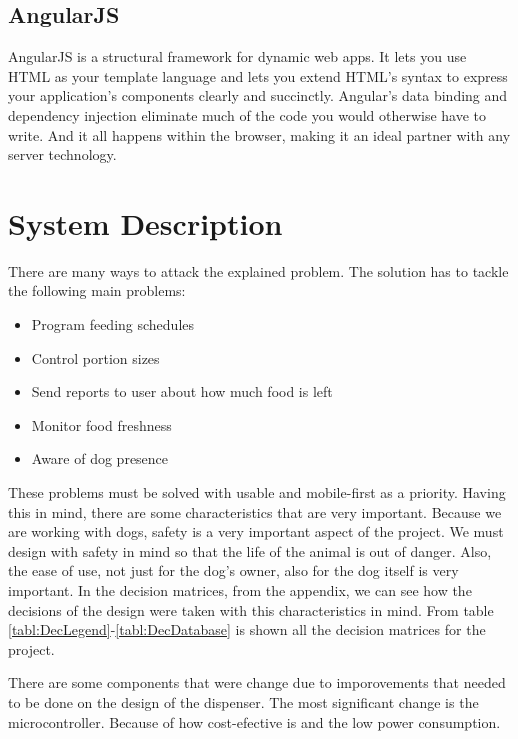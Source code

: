 \documentclass[12pt]{article}
\begin{document}
\subsection{AngularJS}

AngularJS is a structural framework for dynamic web apps. It lets you use HTML as your template language and lets you extend HTML's syntax to express your application's components clearly and succinctly\cite{AngularJS2016}. Angular's data binding and dependency injection eliminate much of the code you would otherwise have to write. And it all happens within the browser, making it an ideal partner with any server technology.


\section{System Description}

There are many ways to attack the explained problem. The solution has to tackle the following main problems:

\begin{itemize}
  \item Program feeding schedules
  \item Control portion sizes
  \item Send reports to user about how much food is left
  \item Monitor food freshness
  \item Aware of dog presence
\end{itemize}

These problems must be solved with usable and mobile-first as a priority. Having this in mind, there are some characteristics that are very important. Because we are working with dogs, safety is a very important aspect of the project. We must design with safety in mind so that the life of the animal is out of danger. Also, the ease of use, not just for the dog's owner, also for the dog itself is very important. In the decision matrices, from the appendix, we can see how the decisions of the design were taken with this characteristics in mind. From table \ref{tabl:DecLegend}-\ref{tabl:DecDatabase} is shown all the decision matrices for the project.

There are some components that were change due to imporovements that needed to be done on the design of the dispenser. The most significant change is the microcontroller. Because of how cost-efective is and the low power consumption.
\end{document}
